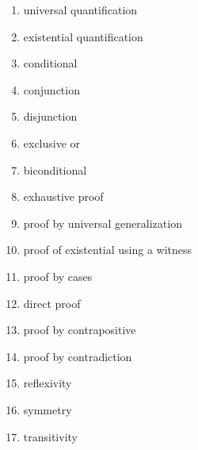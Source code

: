 \begin{multicols}{2}
\begin{enumerate}[label=\roman*]
\item universal quantification
\item existential quantification
\item conditional
\item conjunction
\item disjunction
\item exclusive or
\item biconditional
\item exhaustive proof
\item proof by universal generalization
\item proof of existential using a witness
\item proof by cases
\item direct proof
\item proof by contrapositive
\item proof by contradiction
\item reflexivity
\item symmetry
\item transitivity
\end{enumerate}
\end{multicols}
